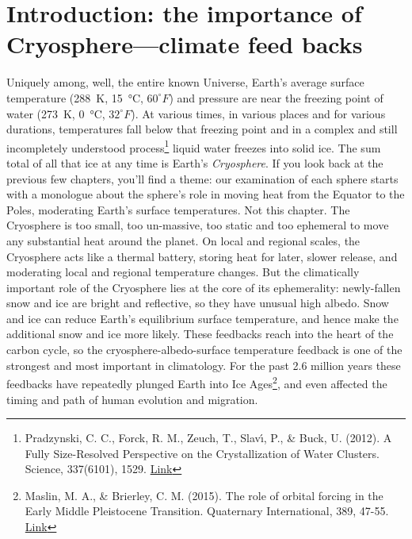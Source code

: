 \section{Introduction: the importance of Cryosphere---climate feed backs}
Uniquely among, well, the entire known Universe, Earth's average surface temperature (\SI{288}{\kelvin}, \SI{15}{\celsius}, $60^{\circ}F$) and pressure are near the freezing point of water (\SI{273}{\kelvin}, \SI{0}{\celsius}, $32^{\circ}F$). At various times, in various places and for various durations, temperatures fall below that freezing point and in a complex and still incompletely understood process\footnote{Pradzynski, C. C., Forck, R. M., Zeuch, T., Slav{\'\i}\vcek, P., \& Buck, U. (2012). A Fully Size-Resolved Perspective on the Crystallization of Water Clusters. Science, 337(6101), 1529. \href{https://doi.org/10.1126/science.1225468}{Link}} liquid water freezes into solid ice. The sum total of all that ice at any time is Earth's \emph{Cryosphere}. If you look back at the previous few chapters, you'll find a theme: our examination of each sphere starts with a monologue about the sphere's role in moving heat from the Equator to the Poles, moderating Earth's surface temperatures. Not this chapter. The Cryosphere is too small, too un-massive, too static and too ephemeral to move any substantial heat around the planet. On local and regional scales, the Cryosphere acts like a thermal battery, storing heat for later, slower release, and moderating local and regional temperature changes. But the climatically important role of the Cryosphere lies at the core of its ephemerality: newly-fallen snow and ice are bright and reflective, so they have unusual high albedo. Snow and ice can reduce Earth's equilibrium surface temperature, and hence make the additional snow and ice more likely. These feedbacks reach into the heart of the carbon cycle, so the cryosphere-albedo-surface temperature feedback is one of the strongest and most important in climatology. For the past 2.6 million years these feedbacks have repeatedly plunged Earth into Ice Ages\footnote{Maslin, M. A., \& Brierley, C. M. (2015). The role of orbital forcing in the Early Middle Pleistocene Transition. Quaternary International, 389, 47-55. \href{https://doi.org/10.1016/j.quaint.2015.01.047}{Link}}, and even affected the timing and path of human evolution and migration.\\

